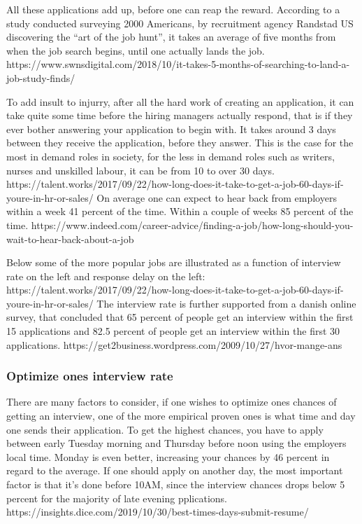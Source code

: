 All these applications add up, before one can reap the reward. According to a
study conducted surveying 2000 Americans, by recruitment agency Randstad US
discovering the “art of the job hunt”, it takes an average of five
months from when the job search begins, until one actually lands
the job.
https://www.swnsdigital.com/2018/10/it-takes-5-months-of-searching-to-land-a-job-study-finds/

To add insult to injurry, after all the hard work of creating an application, it can
take quite some time before the hiring managers actually respond, that is if they ever
bother answering your application to begin with.
It takes around 3 days between they receive the application, before they answer.
This is the case for the most in demand roles in society, for the less in demand roles
such as writers, nurses and unskilled labour, it can be from 10 to over 30 days.
https://talent.works/2017/09/22/how-long-does-it-take-to-get-a-job-60-days-if-youre-in-hr-or-sales/
On average one can expect to hear back from employers within a week 41 percent
of the time. Within a couple of weeks 85 percent of the time.
https://www.indeed.com/career-advice/finding-a-job/how-long-should-you-wait-to-hear-back-about-a-job

Below some of the more popular jobs are illustrated as a function of interview
rate on the left and response delay on the left:
https://talent.works/2017/09/22/how-long-does-it-take-to-get-a-job-60-days-if-youre-in-hr-or-sales/
The interview rate is further supported from a danish online survey, that concluded
that 65 percent of people get an interview within the first 15 applications and
 82.5 percent of people get an interview within the first 30 applications.
 https://get2business.wordpress.com/2009/10/27/hvor-mange-ans%

\subsubsection{Optimize ones interview rate}
There are many factors to consider, if one wishes to optimize ones
chances of getting an interview, one of the more empirical proven ones
is what time and day one sends their application.
To get the highest chances, you have to apply between early Tuesday morning
and Thursday before noon using the employers local time. Monday is even better,
increasing your chances by 46 percent in regard to the average.
If one should apply on another day, the most important factor is that
it's done before 10AM, since the interview chances drops below 5 percent for
the majority of late evening pplications.
https://insights.dice.com/2019/10/30/best-times-days-submit-resume/

